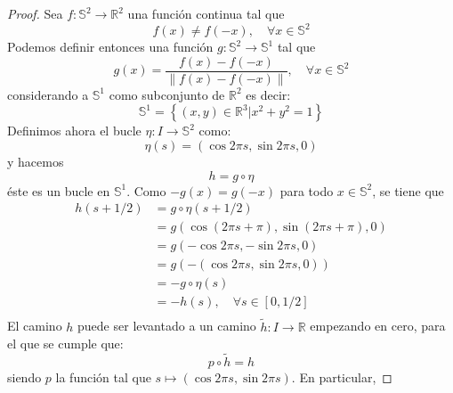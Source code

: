 \documentclass{article}
\newcounter{it}
\theoremstyle{largebreak}
\newcommand\cf[3]{\ensuremath{#1:#2\rightarrow#3}}
\begin{document}
    \begin{proof}
        Sea $\cf{f}{\mathbb{S}^2}{\mathbb{R}^2}$ una función continua tal que
        \begin{equation*}
            f(x)\neq f(-x),\quad\forall x\in\mathbb{S}^2
        \end{equation*}
        Podemos definir entonces una función $\cf{g}{\mathbb{S}^2}{\mathbb{S}^1}$ tal que
        \begin{equation*}
            g(x)=\frac{f(x)-f(-x)}{\|f(x)-f(-x) \|},\quad\forall x\in\mathbb{S}^2
        \end{equation*}
        considerando a $\mathbb{S}^1$ como subconjunto de $\mathbb{R}^2$ es decir:
        \begin{equation*}
            \mathbb{S}^1=\left\{(x,y)\in\mathbb{R}^3\Big|x^2+y^2=1 \right\}
        \end{equation*}
        Definimos ahora el bucle $\cf{\eta}{I}{\mathbb{S}^2}$ como:
        \begin{equation*}
            \eta(s)=(\cos 2\pi s,\sin 2\pi s,0)
        \end{equation*}
        y hacemos
        \begin{equation*}
            h=g\circ \eta
        \end{equation*}
        éste es un bucle en $\mathbb{S}^1$. Como $-g(x)=g(-x)$ para todo $x\in\mathbb{S}^2$, se tiene que
        \begin{equation*}
            \begin{split}
                h(s+1/2)&=g\circ\eta(s+1/2)\\
                &=g(\cos (2\pi s+\pi),\sin (2\pi s+\pi),0)\\
                &=g(-\cos 2\pi s,-\sin 2\pi s,0)\\
                &=g(-(\cos 2\pi s,\sin 2\pi s,0))\\
                &=-g\circ\eta(s)\\
                &=-h(s),\quad\forall s\in[0,1/2]\\
            \end{split}
        \end{equation*}
        El camino $h$ puede ser levantado a un camino $\cf{\widetilde{h}}{I}{\mathbb{R}}$ empezando en cero, para el que se cumple que:
        \begin{equation*}
            p\circ \widetilde{h}=h
        \end{equation*}
        siendo $p$ la función tal que $s\mapsto(\cos 2\pi s,\sin 2\pi s)$. En particular,

\end{proof}
\end{document}
